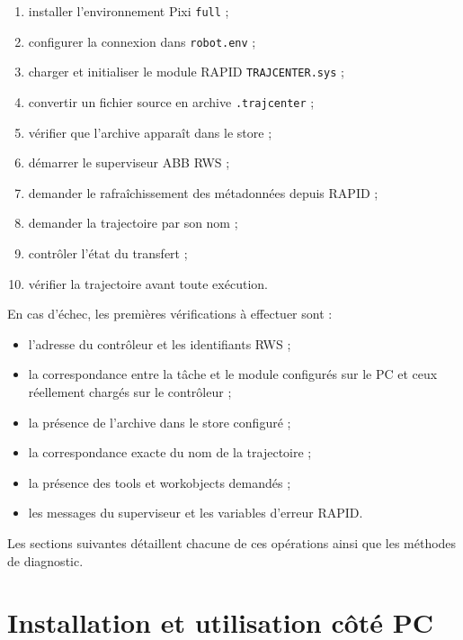 \documentclass{rapportENSAM}
\begin{document}
\begin{enumerate}
    \item installer l'environnement Pixi \texttt{full} ;
    \item configurer la connexion dans \texttt{robot.env} ;
    \item charger et initialiser le module RAPID \texttt{TRAJCENTER.sys} ;
    \item convertir un fichier source en archive \texttt{.trajcenter} ;
    \item vérifier que l'archive apparaît dans le store ;
    \item démarrer le superviseur ABB RWS ;
    \item demander le rafraîchissement des métadonnées depuis RAPID ;
    \item demander la trajectoire par son nom ;
    \item contrôler l'état du transfert ;
    \item vérifier la trajectoire avant toute exécution.
\end{enumerate}

En cas d'échec, les premières vérifications à effectuer sont :

\begin{itemize}
    \item l'adresse du contrôleur et les identifiants RWS ;
    \item la correspondance entre la tâche et le module configurés sur le PC
    et ceux réellement chargés sur le contrôleur ;
    \item la présence de l'archive dans le store configuré ;
    \item la correspondance exacte du nom de la trajectoire ;
    \item la présence des tools et workobjects demandés ;
    \item les messages du superviseur et les variables d'erreur RAPID.
\end{itemize}

Les sections suivantes détaillent chacune de ces opérations ainsi que les
méthodes de diagnostic.

\FloatBarrier




\section{Installation et utilisation côté PC}
\label{sec:pc-usage}
\end{document}
